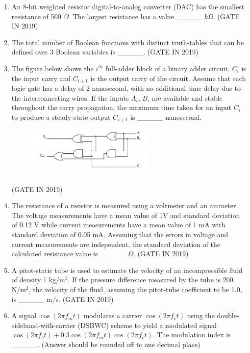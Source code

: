 \documentclass[journal]{IEEEtran}
\begin{document}
\begin{enumerate}
\item An 8-bit weighted resistor digital-to-analog converter (DAC) has the smallest resistance of 500 $\Omega$. The largest resistance has a value \_\_\_\_\_ $k\Omega$.
\hfill(GATE IN 2019)
\item The total number of Boolean functions with distinct truth-tables that can be defined over 3 Boolean variables is \_\_\_\_\_.
\hfill(GATE IN 2019)
\item The figure below shows the $i^{th}$ full-adder block of a binary adder circuit. $C_i$ is the input carry and $C_{i+1}$ is the output carry of the circuit. Assume that each logic gate has a delay of 2 nanosecond, with no additional time delay due to the interconnecting wires. If the inputs $A_i$, $B_i$ are available and stable throughout the carry propagation, the maximum time taken for an input $C_i$ to produce a steady-state output $C_{i+1}$ is \_\_\_\_\_ nanosecond.
\begin{figure}[H]
    \centering
    \includegraphics[width=0.6\textwidth]{8.png}
    \caption{}
    \label{fig:fig8}
\end{figure}
\hfill(GATE IN 2019)
\item The resistance of a resistor is measured using a voltmeter and an ammeter. The voltage measurements have a mean value of 1V and standard deviation of 0.12 V while current measurements have a mean value of 1 mA with standard deviation of 0.05 mA. Assuming that the errors in voltage and current measurements are independent, the standard deviation of the calculated resistance value is \_\_\_\_\_ $\Omega$.
\hfill(GATE IN 2019)
\item A pitot-static tube is used to estimate the velocity of an incompressible fluid of density 1 kg/m$^3$. If the pressure difference measured by the tube is 200 N/m$^2$, the velocity of the fluid, assuming the pitot-tube coefficient to be 1.0, is \_\_\_\_\_ m/s.
\hfill(GATE IN 2019)
\item A signal $\cos(2\pi f_m t)$ modulates a carrier $\cos(2\pi f_c t)$ using the double-sideband-with-carrier (DSBWC) scheme to yield a modulated signal $\cos(2\pi f_c t)+0.3\cos(2\pi f_m t)\cos(2\pi f_c t)$. The modulation index is \_\_\_\_\_. (Answer should be rounded off to one decimal place)

\end{enumerate}
\end{document}
